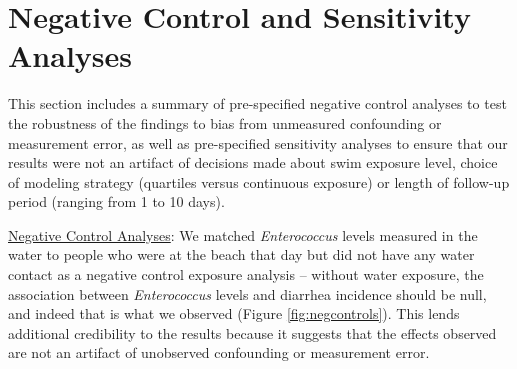 \documentclass[12pt]{article}\usepackage[]{graphicx}\usepackage[]{color}
\begin{document}


\clearpage
\section{Negative Control and Sensitivity Analyses}

This section includes a summary of pre-specified negative control analyses to test the robustness of the findings to bias from unmeasured confounding or measurement error, as well as pre-specified sensitivity analyses to ensure that our results were not an artifact of decisions made about swim exposure level, choice of modeling strategy (quartiles versus continuous exposure) or length of follow-up period (ranging from 1 to 10 days).

\bigskip
\underline{Negative Control Analyses}: We matched \emph{Enterococcus} levels measured in the water to people who were at the beach that day but did not have any water contact as a negative control exposure analysis\supercite{Lipsitch2010-kq,Colford2012-um} -- without water exposure, the association between \emph{Enterococcus} levels and diarrhea incidence should be null, and indeed that is what we observed (Figure \ref{fig:negcontrols}). This lends additional credibility to the results because it suggests that the effects observed are not an artifact of unobserved confounding or measurement error.\supercite{Lipsitch2010-kq}
\end{document}

